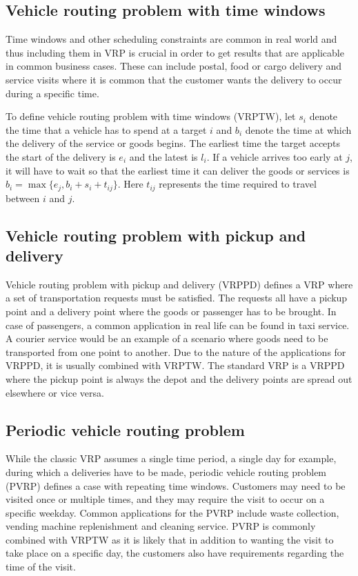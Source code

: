 \subsection{Vehicle routing problem with time windows}

Time windows and other scheduling constraints are common in real world and thus including them in VRP is crucial in order to get results that are applicable in common business cases. These can include postal, food or cargo delivery and service visits where it is common that the customer wants the delivery to occur during a specific time. \cite{cordeau2000vrp}

To define vehicle routing problem with time windows (VRPTW), let $s_i$ denote the time that a vehicle has to spend at a target $i$ and $b_i$ denote the time at which the delivery of the service or goods begins. The earliest time the target accepts the start of the delivery is $e_i$ and the latest is $l_i$. If a vehicle arrives too early at $j$, it will have to wait so that the earliest time it can deliver the goods or services is $b_i = \max\{e_j, b_i + s_i + t_{ij}\}$. Here $t_{ij}$ represents the time required to travel between $i$ and $j$. \cite{solomon1987algorithms}


\subsection{Vehicle routing problem with pickup and delivery}

Vehicle routing problem with pickup and delivery (VRPPD) defines a VRP where a set of transportation requests must be satisfied. The requests all have a pickup point and a delivery point where the goods or passenger has to be brought. In case of passengers, a common application in real life can be found in taxi service. A courier service would be an example of a scenario where goods need to be transported from one point to another. Due to the nature of the applications for VRPPD, it is usually combined with VRPTW. The standard VRP is a VRPPD where the pickup point is always the depot and the delivery points are spread out elsewhere or vice versa. \cite{desaulniers2000vrp}


\subsection{Periodic vehicle routing problem}

While the classic VRP assumes a single time period, a single day for example, during which a deliveries have to be made, periodic vehicle routing problem (PVRP) defines a case with repeating time windows. Customers may need to be visited once or multiple times, and they may require the visit to occur on a specific weekday. \cite{blakeley2003optimizing} Common applications for the PVRP include waste collection, vending machine replenishment and cleaning service. PVRP is commonly combined with VRPTW as it is likely that in addition to wanting the visit to take place on a specific day, the customers also have requirements regarding the time of the visit. \cite{yu2011ant}



